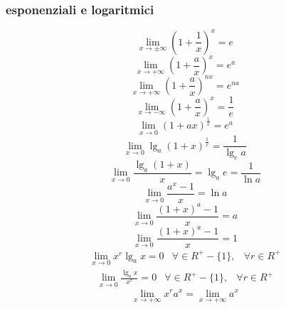\subsubsection{esponenziali e logaritmici}
\begin{multicols}{2}
\begin{equation}
	\lim_{x\to\pm\infty}\left(1+\frac{1}{x}\right)^x=e
\end{equation}
\begin{equation}
	\lim_{x\to+\infty}\left(1+\frac{a}{x}\right)^x=e^a
\end{equation}
\begin{equation}
	\lim_{x\to+\infty}\left(1+\frac{a}{x}\right)^{nx}=e^{na}
\end{equation}
\begin{equation}
	\lim_{x\to-\infty}\left(1+\frac{a}{x}\right)^x=\frac{1}{e}
\end{equation}
\begin{equation}
	\lim_{x\to0}\left(1+ax\right)^{\frac{1}{x}}=e^{a}
\end{equation}
\begin{equation}
	\lim_{x\to0}\lg_a\left(1+x\right)^\frac{1}{x}=\frac{1}{\lg_e a}
\end{equation}
\begin{equation}
	\lim_{x\to0}\frac{\lg_a\left(1+x\right)}{x}=\lg_ae=\frac{1}{\ln a}
\end{equation}
\begin{equation}
	\lim_{x\to0}\frac{a^x-1}{x}=\ln a
\end{equation}
\begin{equation}
	\lim_{x\to0}\frac{\left(1+x\right)^a-1}{x}=a
\end{equation}
\begin{equation}
	\lim_{x\to0}\frac{\left(1+x\right)^a-1}{x}=1
\end{equation}
\begin{equation}
	\begin{matrix}
		\lim_{x\to0}x^r\lg_a x=0&\forall \in R^+-\{1\},&\forall r\in R^+
	\end{matrix}
\end{equation}
\begin{equation}
	\begin{matrix}
		\lim_{x\to0}\frac{\lg_a x}{x^r}=0&\forall \in R^+-\{1\},&\forall r\in R^+
	\end{matrix}
\end{equation}
\begin{equation}
	\lim_{x\to+\infty}x^ra^x=\lim_{x\to+\infty}a^x

\end{equation}
\end{multicols}
